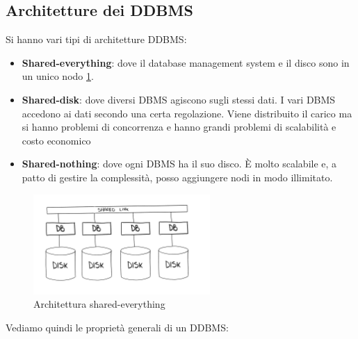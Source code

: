 \subsection{Architetture dei DDBMS}
Si hanno vari tipi di architetture DDBMS:
\begin{itemize}
    \item \textbf{Shared-everything}: dove il database management system e il
          disco sono in un unico nodo \ref{fig:sharedEverything}.
    \item \textbf{Shared-disk}: dove diversi DBMS agiscono sugli stessi dati. I
          vari DBMS accedono ai dati secondo una certa regolazione.
          Viene distribuito il carico ma si hanno problemi di concorrenza e
          hanno grandi problemi di scalabilità e costo economico
    \item \textbf{Shared-nothing}: dove ogni DBMS ha il suo disco. È molto
          scalabile e, a patto di gestire la complessità, posso aggiungere nodi
          in modo illimitato.
\end{itemize}
\begin{figure}[ht]
      \centering
      \includegraphics[width=0.60\textwidth]{img/SharedEverything.jpg}
      \caption{Architettura shared-everything}
      \label{fig:sharedEverything}
\end{figure}
Vediamo quindi le proprietà generali di un DDBMS:
